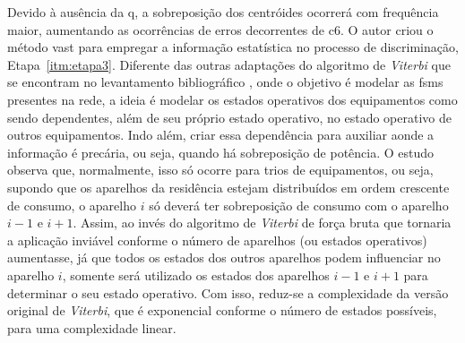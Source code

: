 \begin{enumerate}[label=\textbf{1.\arabic*},wide=\parindent]
Devido à ausência da \acl{q}, a sobreposição dos centróides ocorrerá
com frequência maior, aumentando as ocorrências de erros decorrentes
de \gls{c6}. O autor criou o método \gls{vast} para empregar a informação
estatística no processo de discriminação, Etapa~\ref{itm:etapa3}.
Diferente das outras adaptações do algoritmo de \emph{Viterbi} que se
encontram no levantamento bibliográfico
\cite{nilm_bouloutas_viterbi_ext_1991_11,
nilm_hart_fsm_viterbi_1993_12,nilm_baranski_genetic_base_2003_19,
nilm_baranski_genetic_detalhado_2004_20,nilm_baranski_summary_2004_21},
onde o objetivo é modelar as \glspl{fsm} presentes na rede, a ideia é
modelar os estados operativos dos equipamentos como sendo dependentes,
além de seu próprio estado operativo, no estado operativo de outros
equipamentos. Indo além, criar essa dependência para auxiliar aonde a
informação é precária, ou seja, quando há sobreposição de potência.  O
estudo observa que, normalmente, isso só ocorre para trios de
equipamentos, ou seja, supondo que os aparelhos da residência estejam
distribuídos em ordem crescente de consumo, o aparelho $i$ só deverá
ter sobreposição de consumo com o aparelho $i-1$ e $i+1$. Assim, ao
invés do algoritmo de \emph{Viterbi} de força bruta que tornaria a
aplicação inviável conforme o número de aparelhos (ou estados
operativos) aumentasse, já que todos os estados dos outros aparelhos
podem influenciar no aparelho $i$, somente será utilizado os estados
dos aparelhos $i-1$ e $i+1$ para determinar o seu estado operativo.
Com isso, reduz-se a complexidade da versão original de
\emph{Viterbi}, que é exponencial conforme o número de estados
possíveis, para uma complexidade linear.



\end{enumerate}
